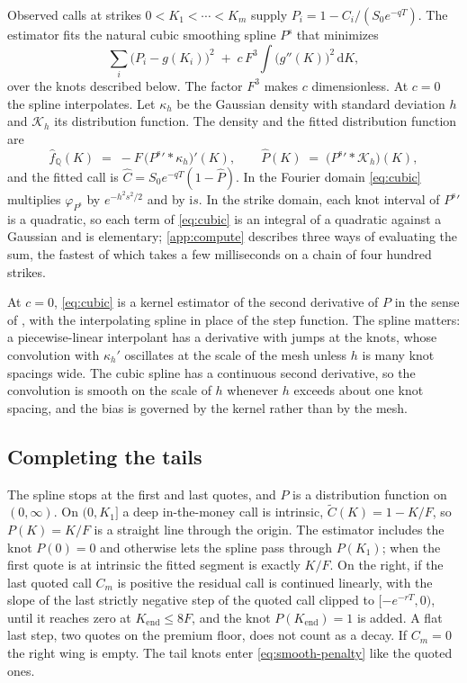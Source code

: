 \documentclass[preprint,12pt,authoryear,times]{elsarticle}
\newcommand{\Q}{\mathbb{Q}}
\newcommand{\Ct}{\tilde C}
\newcommand{\Pcs}{P^{\mathrm{s}}}
\newcommand{\fhat}{\hat f_{\Q}}
\begin{document}
Observed calls at strikes \(0<K_1<\cdots<K_m\) supply \(P_i=1-C_i/(S_0e^{-qT})\). The estimator fits the natural cubic smoothing spline \(\Pcs\) that minimizes
\begin{equation}
\label{eq:smooth-penalty}
\sum_i\bigl(P_i-g(K_i)\bigr)^2
\;+\;
c\,F^3\int\bigl(g''(K)\bigr)^2\,\mathrm{d}K ,
\end{equation}
over the knots described below. The factor \(F^3\) makes \(c\) dimensionless. At \(c=0\) the spline interpolates. Let \(\kappa_h\) be the Gaussian density with standard deviation \(h\) and \(\mathcal K_h\) its distribution function. The density and the fitted distribution function are
\begin{equation}
\label{eq:cubic}
\fhat(K)
\;=\;
-F\,\bigl(\Pcs{}'\ast\kappa_h\bigr)'(K),
\qquad
\hat P(K)
\;=\;
\bigl(\Pcs{}'\ast\mathcal K_h\bigr)(K),
\end{equation}
and the fitted call is \(\hat C=S_0e^{-qT}(1-\hat P)\). In the Fourier domain \eqref{eq:cubic} multiplies \(\varphi_{\Pcs}\) by \(e^{-h^2s^2/2}\) and by \(\mathrm{i}s\). In the strike domain, each knot interval of \(\Pcs{}'\) is a quadratic, so each term of \eqref{eq:cubic} is an integral of a quadratic against a Gaussian and is elementary; \ref{app:compute} describes three ways of evaluating the sum, the fastest of which takes a few milliseconds on a chain of four hundred strikes.

At \(c=0\), \eqref{eq:cubic} is a kernel estimator of the second derivative of \(P\) in the sense of \citet{gassermuller1984}, with the interpolating spline in place of the step function. The spline matters: a piecewise-linear interpolant has a derivative with jumps at the knots, whose convolution with \(\kappa_h'\) oscillates at the scale of the mesh unless \(h\) is many knot spacings wide. The cubic spline has a continuous second derivative, so the convolution is smooth on the scale of \(h\) whenever \(h\) exceeds about one knot spacing, and the bias is governed by the kernel rather than by the mesh.

\subsection{Completing the tails}
\label{sec:tails}

The spline stops at the first and last quotes, and \(P\) is a distribution function on \((0,\infty)\). On \((0,K_1]\) a deep in-the-money call is intrinsic, \(\Ct(K)=1-K/F\), so \(P(K)=K/F\) is a straight line through the origin. The estimator includes the knot \(P(0)=0\) and otherwise lets the spline pass through \(P(K_1)\); when the first quote is at intrinsic the fitted segment is exactly \(K/F\). On the right, if the last quoted call \(C_m\) is positive the residual call is continued linearly, with the slope of the last strictly negative step of the quoted call clipped to \([-e^{-rT},0)\), until it reaches zero at \(K_{\mathrm{end}}\le 8F\), and the knot \(P(K_{\mathrm{end}})=1\) is added. A flat last step, two quotes on the premium floor, does not count as a decay. If \(C_m=0\) the right wing is empty. The tail knots enter \eqref{eq:smooth-penalty} like the quoted ones.
\end{document}
